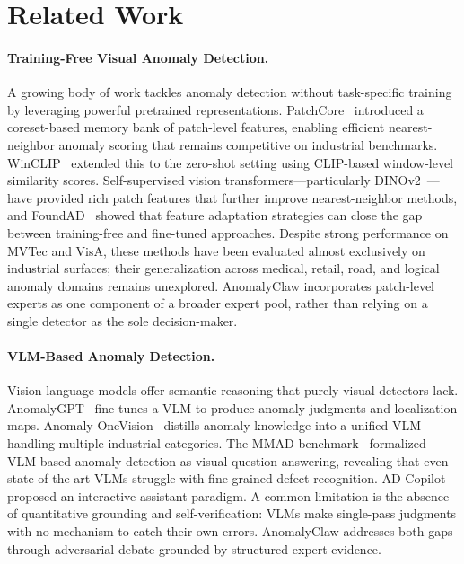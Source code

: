 \section{Related Work}
\label{sec:related}

\paragraph{Training-Free Visual Anomaly Detection.}
A growing body of work tackles anomaly detection without task-specific training by leveraging powerful pretrained representations.
PatchCore~\citep{roth2022patchcore} introduced a coreset-based memory bank of patch-level features, enabling efficient nearest-neighbor anomaly scoring that remains competitive on industrial benchmarks.
WinCLIP~\citep{jeong2023winclip} extended this to the zero-shot setting using CLIP-based window-level similarity scores.
Self-supervised vision transformers---particularly DINOv2~\citep{oquab2024dinov2}---have provided rich patch features that further improve nearest-neighbor methods, and FoundAD~\citep{li2026foundad} showed that feature adaptation strategies can close the gap between training-free and fine-tuned approaches.
Despite strong performance on MVTec and VisA, these methods have been evaluated almost exclusively on industrial surfaces; their generalization across medical, retail, road, and logical anomaly domains remains unexplored.
AnomalyClaw incorporates patch-level experts as one component of a broader expert pool, rather than relying on a single detector as the sole decision-maker.

\paragraph{VLM-Based Anomaly Detection.}
Vision-language models offer semantic reasoning that purely visual detectors lack.
AnomalyGPT~\citep{gu2024anomalygpt} fine-tunes a VLM to produce anomaly judgments and localization maps.
Anomaly-OneVision~\citep{cao2025anomalyonevision} distills anomaly knowledge into a unified VLM handling multiple industrial categories.
The MMAD benchmark~\citep{jiang2024mmad} formalized VLM-based anomaly detection as visual question answering, revealing that even state-of-the-art VLMs struggle with fine-grained defect recognition.
AD-Copilot~\citep{zhang2026adcopilot} proposed an interactive assistant paradigm.
A common limitation is the absence of quantitative grounding and self-verification: VLMs make single-pass judgments with no mechanism to catch their own errors.
AnomalyClaw addresses both gaps through adversarial debate grounded by structured expert evidence.

